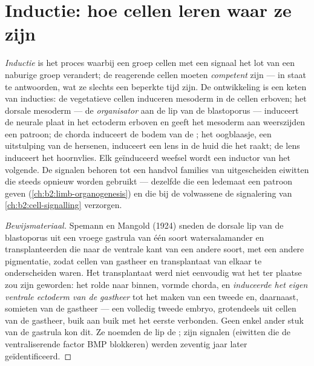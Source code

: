 \section{Inductie: hoe cellen leren waar ze zijn}

\begin{definition}\label{def:b2:vertebrate-development:induction}
\emph{Inductie} is het proces waarbij een groep cellen met een signaal het
lot van een naburige groep verandert; de reagerende cellen moeten
\emph{competent} zijn --- in staat te antwoorden, wat ze slechts een
beperkte tijd zijn. De ontwikkeling is een keten van inducties: de
vegetatieve cellen induceren mesoderm in de cellen erboven; het dorsale
mesoderm --- de \emph{organisator} aan de lip van de blastoporus ---
induceert de neurale plaat in het ectoderm erboven en geeft het mesoderm
aan weerszijden een patroon; de chorda induceert de bodem van de ; het oogblaasje, een uitstulping van de hersenen, induceert een lens in
de huid die het raakt; de lens induceert het hoornvlies. Elk geïnduceerd
weefsel wordt een inductor van het volgende. De signalen behoren tot een
handvol families van uitgescheiden eiwitten die steeds opnieuw worden
gebruikt --- dezelfde die een ledemaat een patroon geven
(\cref{ch:b2:limb-organogenesis}) en die bij de volwassene de signalering
van \cref{ch:b2:cell-signalling} verzorgen.
\end{definition}
\begin{proof}[Bewijsmateriaal]
Spemann en Mangold (1924) sneden de dorsale lip van de blastoporus uit een
vroege gastrula van één soort watersalamander en transplanteerden die naar
de ventrale kant van een andere soort, met een andere pigmentatie, zodat
cellen van gastheer en transplantaat van elkaar te onderscheiden waren. Het
transplantaat werd niet eenvoudig wat het ter plaatse zou zijn geworden:
het rolde naar binnen, vormde chorda, en \emph{induceerde het eigen ventrale
ectoderm van de gastheer} tot het maken van een tweede  en,
daarnaast, somieten van de gastheer --- een volledig tweede embryo,
grotendeels uit cellen van de gastheer, buik aan buik met het eerste
verbonden. Geen enkel ander stuk van de gastrula kon dit. Ze noemden de lip
de ; zijn signalen (eiwitten die de ventraliserende factor BMP
blokkeren) werden zeventig jaar later geïdentificeerd.
\end{proof}

